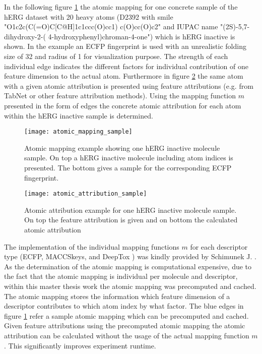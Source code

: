\documentclass[../main.tex]{subfiles}
\begin{document}
In the following figure \ref{fig:atomic_mapping_sample} the atomic mapping for one concrete sample of the hERG dataset with 20 heavy atoms (D2392 with smile "O1c2c(C(=O)C[C@H]1c1ccc(O)cc1) c(O)cc(O)c2" and IUPAC name "(2S)-5,7-dihydroxy-2-( 4-hydroxyphenyl)chroman-4-one") which is hERG inactive is shown. In the example an ECFP fingerprint is used with an unrealistic folding size of 32 and radius of 1 for visualization purpose. The strength of each individual edge indicates the different factors for individual contribution of one feature dimension to the actual atom. Furthermore in figure \ref{fig:atomic_attribution_sample} the same atom with a given atomic attribution is presented using feature attributions (e.g. from TabNet or other feature attribution methods). Using the mapping function $m$ presented in the form of edges the concrete atomic attribution for each atom within the hERG inactive sample is determined.

\begin{figure}[H]
    \centering
    \texttt{[image: atomic\_mapping\_sample]}    
    \caption{Atomic mapping example showing one hERG inactive molecule sample. On top a hERG inactive molecule including atom indices is presented. The bottom gives a sample for the corresponding ECFP fingerprint.}
    \label{fig:atomic_mapping_sample}
\end{figure}

\begin{figure}[H]
    \centering
    \texttt{[image: atomic\_attribution\_sample]}    
    \caption{Atomic attribution example for one hERG inactive molecule sample. On top the feature attribution is given and on bottom the calculated atomic attribution}
    \label{fig:atomic_attribution_sample}
\end{figure}

The implementation of the individual mapping functions $m$ for each descriptor type (ECFP, MACCSkeys, and DeepTox \cite{DeepTox}) was kindly provided by Schimunek J. \cite{schimunek_poster_2021}. As the determination of the atomic mapping is computational expensive, due to the fact that the atomic mapping is individual per molecule and descriptor, within this master thesis work the atomic mapping was precomputed and cached. The atomic mapping stores the information which feature dimension of a descriptor contributes to which atom index by what factor. The blue edges in figure \ref{fig:atomic_mapping_sample} refer a sample atomic mapping which can be precomputed and cached. Given feature attributions using the precomputed atomic mapping the atomic attribution can be calculated without the usage of the actual mapping function $m$. This significantly improves experiment runtime. 
\end{document}
